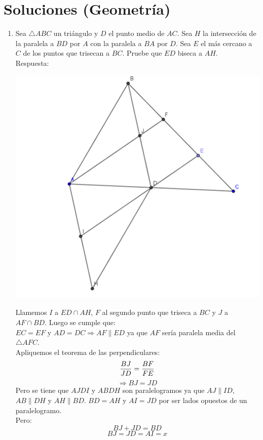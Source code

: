 \documentclass{book}
\begin{document}
\section{Soluciones (Geometría)}
\begin{enumerate}
    \item Sea $\triangle ABC$ un triángulo y $D$ el punto medio de $AC$. Sea $H$ la intersección de la paralela a $BD$ por $A$ con la paralela a $BA$ por $D$. Sea $E$ el más cercano a $C$ de los puntos que trisecan a $BC$. Pruebe que $ED$ biseca a $AH$.\\
          Respuesta:
          \begin{center}
              \includegraphics[scale=1]{imagenes/Geometria/1.png}
          \end{center}
          Llamemos $I$ a $ED\cap AH$, $F$ al segundo punto que triseca a $BC$ y $J$ a $AF\cap BD$. Luego se cumple que:\\
          $EC=EF$ y $AD=DC\Rightarrow AF\parallel ED$ ya que $AF$ sería paralela media del $\triangle AFC$.\\
          Apliquemos el teorema de las perpendiculares:
          $${BJ\over JD}={BF\over FE}$$
          $$\Rightarrow BJ=JD$$
          Pero se tiene que $AJDI$ y $ABDH$ son paralelogramos ya que $AJ\parallel ID$, $AB\parallel DH$ y $AH\parallel BD$.
          $BD=AH$ y $AI=JD$ por ser lados opuestos de un paralelogramo.\\
          Pero:
          $$BJ+JD=BD$$
          $$BJ=JD=AI=x$$

\end{enumerate}
\end{document}
